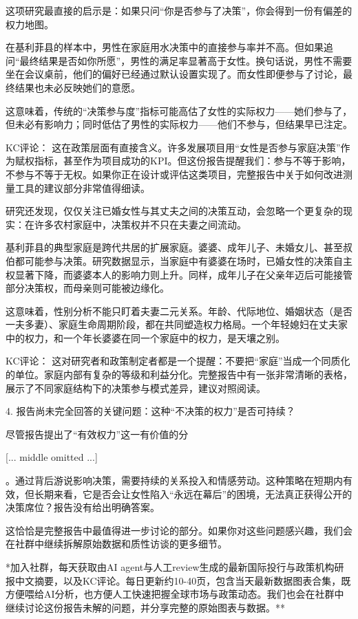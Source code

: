 \documentclass[11pt]{ctexart}
\begin{document}
这项研究最直接的启示是：如果只问“你是否参与了决策”，你会得到一份有偏差的权力地图。

在基利菲县的样本中，男性在家庭用水决策中的直接参与率并不高。但如果追问“最终结果是否如你所愿”，男性的满足率显著高于女性。换句话说，男性不需要坐在会议桌前，他们的偏好已经通过默认设置实现了。而女性即便参与了讨论，最终结果也未必反映她们的意愿。

这意味着，传统的“决策参与度”指标可能高估了女性的实际权力——她们参与了，但未必有影响力；同时低估了男性的实际权力——他们不参与，但结果早已注定。

KC评论： 这在政策层面有直接含义。许多发展项目用“女性是否参与家庭决策”作为赋权指标，甚至作为项目成功的KPI。但这份报告提醒我们：参与不等于影响，不参与不等于无权。如果你正在设计或评估这类项目，完整报告中关于如何改进测量工具的建议部分非常值得细读。

研究还发现，仅仅关注已婚女性与其丈夫之间的决策互动，会忽略一个更复杂的现实：在许多农村家庭中，决策权并不只在夫妻之间流动。

基利菲县的典型家庭是跨代共居的扩展家庭。婆婆、成年儿子、未婚女儿、甚至叔伯都可能参与决策。研究数据显示，当家庭中有婆婆在场时，已婚女性的决策自主权显著下降，而婆婆本人的影响力则上升。同样，成年儿子在父亲年迈后可能接管部分决策权，而母亲则可能被边缘化。

这意味着，性别分析不能只盯着夫妻二元关系。年龄、代际地位、婚姻状态（是否一夫多妻）、家庭生命周期阶段，都在共同塑造权力格局。一个年轻媳妇在丈夫家中的权力，和一个年长婆婆在同一个家庭中的权力，是天壤之别。

KC评论： 这对研究者和政策制定者都是一个提醒：不要把“家庭”当成一个同质化的单位。家庭内部有复杂的等级和利益分化。完整报告中有一张非常清晰的表格，展示了不同家庭结构下的决策参与模式差异，建议对照阅读。

4. 报告尚未完全回答的关键问题：这种“不决策的权力”是否可持续？

尽管报告提出了“有效权力”这一有价值的分

[... middle omitted ...]

。通过背后游说影响决策，需要持续的关系投入和情感劳动。这种策略在短期内有效，但长期来看，它是否会让女性陷入“永远在幕后”的困境，无法真正获得公开的决策席位？报告没有给出明确答案。

这恰恰是完整报告中最值得进一步讨论的部分。如果你对这些问题感兴趣，我们会在社群中继续拆解原始数据和质性访谈的更多细节。

*加入社群，每天获取由AI agent与人工review生成的最新国际投行与政策机构研报中文摘要，以及KC评论。每日更新约10-40页，包含当天最新数据图表合集，既方便喂给AI分析，也方便人工快速把握全球市场与政策动态。我们也会在社群中继续讨论这份报告未解的问题，并分享完整的原始图表与数据。**
\end{document}
